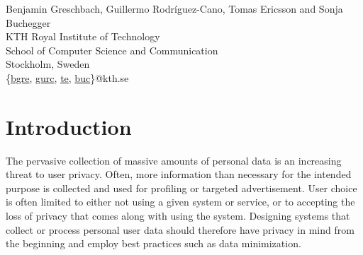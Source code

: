 


%


\def\thanks#1{\footnotemark
    \protected@xdef\@thanks{\@thanks
        \protect\footnotetext[\the\c@footnote]{#1}}%
}

\begin{center}
Benjamin Greschbach, Guillermo Rodr\'{i}guez-Cano, Tomas Ericsson and Sonja Buchegger\\[2em]

KTH Royal Institute of Technology\\
School of Computer Science and Communication\\
Stockholm, Sweden\\
\{\href{bgre@kth.se}{bgre}, \href{gurc@kth.se}{gurc}, \href{te@kth.se}{te}, \href{buc@kth.se}{buc}\}@kth.se

\end{center}

\begin{abstract}
    
\end{abstract}


\clearpage
\section{Introduction}
    \label{section:document-submission-system:introduction}

The pervasive collection of massive amounts of personal data is an
increasing threat to user privacy. Often, more information than
necessary for the intended purpose is collected and used for profiling
or targeted advertisement. User choice is often limited
to either not using a given system or service, or to accepting the loss of
privacy that comes along with using the system. Designing systems that
collect or process personal user data should therefore have privacy in
mind from the beginning and employ best practices such as
data minimization.

